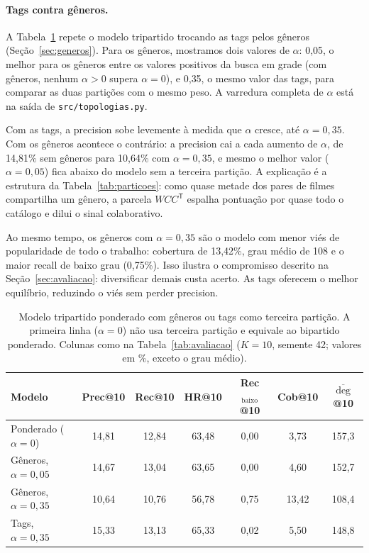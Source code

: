 \documentclass[12pt,a4paper]{article}
\theoremstyle{definition}
\begin{document}
\paragraph{Tags contra gêneros.}
A Tabela~\ref{tab:tags-generos} repete o modelo tripartido trocando as
tags pelos gêneros (Seção~\ref{sec:generos}). Para os gêneros, mostramos
dois valores de $\alpha$: 0{,}05, o melhor para os gêneros entre os
valores positivos da busca em grade (com gêneros, nenhum $\alpha > 0$
supera $\alpha = 0$), e 0{,}35, o mesmo valor das tags, para
comparar as duas partições com o mesmo peso. A varredura completa de
$\alpha$ está na saída de \texttt{src/topologias.py}.

Com as tags, a precision sobe levemente à medida que $\alpha$ cresce, até
$\alpha = 0{,}35$. Com os gêneros acontece o contrário: a precision cai a
cada aumento de $\alpha$, de 14{,}81\% sem gêneros para 10{,}64\% com
$\alpha = 0{,}35$, e mesmo o melhor valor ($\alpha = 0{,}05$) fica abaixo
do modelo sem a terceira partição. A explicação é a estrutura da
Tabela~\ref{tab:particoes}: como quase metade dos pares de filmes
compartilha um gênero, a parcela $WCC^{\mathsf T}$ espalha pontuação por
quase todo o catálogo e dilui o sinal colaborativo.

Ao mesmo tempo, os gêneros com $\alpha = 0{,}35$ são o modelo com menor
viés de popularidade de todo o trabalho: cobertura de 13{,}42\%, grau
médio de 108 e o maior recall de baixo grau (0{,}75\%). Isso ilustra o
compromisso descrito na Seção~\ref{sec:avaliacao}: diversificar demais
custa acerto. As tags oferecem o melhor equilíbrio, reduzindo o viés sem
perder precision.

\begin{table}[ht]
\centering
\small
\begin{tabular}{lcccccc}
\toprule
Modelo & Prec@10 & Rec@10 & HR@10 & Rec$_{\text{baixo}}$@10 & Cob@10 & $\overline{\deg}$@10 \\
\midrule
Ponderado ($\alpha = 0$)            & 14{,}81 & 12{,}84 & 63{,}48 & 0{,}00 & 3{,}73 & 157{,}3 \\
Gêneros, $\alpha = 0{,}05$          & 14{,}67 & 13{,}04 & 63{,}65 & 0{,}00 & 4{,}60 & 152{,}7 \\
Gêneros, $\alpha = 0{,}35$          & 10{,}64 & 10{,}76 & 56{,}78 & 0{,}75 & 13{,}42 & 108{,}4 \\
Tags, $\alpha = 0{,}35$             & 15{,}33 & 13{,}13 & 65{,}33 & 0{,}02 & 5{,}50 & 148{,}8 \\
\bottomrule
\end{tabular}
\caption{Modelo tripartido ponderado com gêneros ou tags como terceira
partição. A primeira linha ($\alpha = 0$) não usa terceira partição e
equivale ao bipartido ponderado. Colunas como na
Tabela~\ref{tab:avaliacao} ($K = 10$, semente 42; valores em \%, exceto
o grau médio).}
\label{tab:tags-generos}
\end{table}
\end{document}
